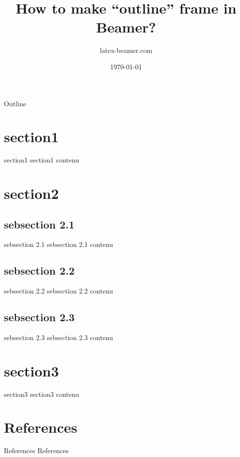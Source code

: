 \documentclass{beamer}
\title{How to make “outline” frame in Beamer?}
\author{latex-beamer.com}
\date{\today}
\begin{document}
\begin{frame}
    \titlepage 
\end{frame}

\begin{frame}{Outline}
    \tableofcontents
\end{frame}

\section{section1}
    \begin{frame}{section1}
        section1 contenu
    \end{frame}

\section{section2}
    \subsection{sebsection 2.1}
        \begin{frame}{sebsection 2.1}
            sebsection 2.1 contenu
        \end{frame}
    \subsection{sebsection 2.2}
        \begin{frame}{sebsection 2.2}
            sebsection 2.2 contenu
        \end{frame}
    \subsection{sebsection 2.3}
        \begin{frame}{sebsection 2.3}
            sebsection 2.3 contenu
        \end{frame}
\section{section3}
    \begin{frame}{section3}
        section3 contenu
    \end{frame}
\section*{References}
    \begin{frame}{References}
        References
    \end{frame}
 
\end{document}
